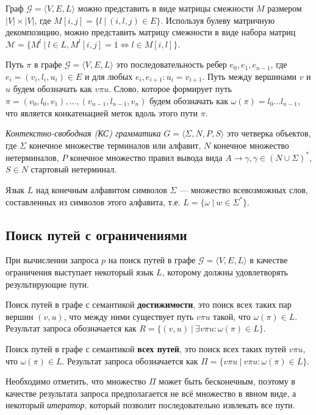 \documentclass[14pt]{matmex-diploma-custom}
\begin{document}
Граф $\mathcal{G} = \langle V, E, L \rangle$ можно представить в виде матрицы смежности $M$ размером $|V| \times |V|$, где $M[i,j] = \{l~|~(i,l,j) \in E\}$. Используя булеву матричную декомпозицию, можно представить матрицу смежности в виде набора матриц $\mathcal{M} = \{ M^l ~|~ l \in L, M^l[i,j] = 1 \iff l \in M[i,l]\}$.

Путь $\pi$ в графе $\mathcal{G} = \langle V, E, L \rangle$ это последовательность ребер $e_0,e_1,e_{n-1}$, где $e_i = (v_i, l_i, u_i) \in E$ и для любых $e_i, e_{i+1}: u_i = v_{i+1}$. Путь между вершинами $v$ и $u$ будем обозначать как $v \pi u$. Слово, которое формирует путь $\pi = (v_0, l_0, v_1), ... ,(v_{n-1}, l_{n-1}, v_n)$ будем обозначать как $\omega (\pi) = l_0 ... l_{n-1}$, что является конкатенацией меток вдоль этого пути $\pi$.

\textit{Контекстно-свободная (КС) грамматика} $G = \langle \Sigma, N, P, S \rangle$ это четверка объектов, где $\Sigma$ конечное множестве терминалов или алфавит, $N$ конечное множество нетерминалов, $P$ конечное множество правил вывода вида $A \rightarrow \gamma, \gamma \in (N \cup \Sigma)^*$, $S \in N$ стартовый нетерминал. 

Язык $L$ над конечным алфавитом символов $\Sigma$ --- множество всевозможных слов, составленных из символов этого алфавита, т.е. $L = \{\omega~|~w \in \Sigma ^*\}$.

\subsection{Поиск путей с ограничениями}

При вычислении запроса $p$ на поиск путей в графе $\mathcal{G} = \langle V, E, L \rangle$ в качестве ограничения выступает некоторый язык $L$, которому должны удовлетворять результирующие пути.

Поиск путей в графе с семантикой \textbf{достижимости}, это поиск всех таких пар вершин $(v,u)$, что между ними существует путь $v \pi u$ такой, что $\omega (\pi) \in L$. Результат запроса обозначается как $R = \{ (v,u)~|~\exists v \pi u : \omega (\pi) \in L \}$.

Поиск путей в графе с семантикой \textbf{всех путей}, это поиск всех таких путей $v \pi u$,   что $\omega (\pi) \in L$. Результат запроса обозначается как $\Pi = \{ v \pi u~|~v \pi u : \omega (\pi) \in L \}$.

Необходимо отметить, что множество $\Pi$ может быть бесконечным, поэтому в качестве результата запроса предполагается не всё множество в явном виде, а некоторый \textit{итератор}, который позволит последовательно извлекать все пути.
\end{document}
